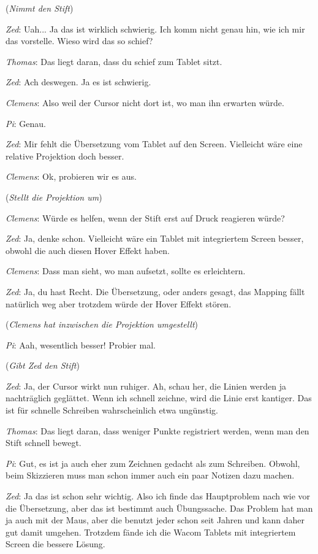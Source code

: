 \medskip (\emph{Nimmt den Stift})

\medskip \emph{Zed}: Uah... Ja das ist wirklich schwierig. Ich komm nicht genau hin, wie ich mir das vorstelle. Wieso wird das so schief?

\medskip \emph{Thomas}: Das liegt daran, dass du schief zum Tablet sitzt.

\medskip \emph{Zed}: Ach deswegen. Ja es ist schwierig.

\medskip \emph{Clemens}: Also weil der Cursor nicht dort ist, wo man ihn erwarten würde.

\medskip \emph{Pi}: Genau.

\medskip \emph{Zed}: Mir fehlt die Übersetzung vom Tablet auf den Screen. Vielleicht wäre eine relative Projektion doch besser.

\medskip \emph{Clemens}: Ok, probieren wir es aus.

\medskip (\emph{Stellt die Projektion um})

\medskip \emph{Clemens}: Würde es helfen, wenn der Stift erst auf Druck reagieren würde?

\medskip \emph{Zed}: Ja, denke schon. Vielleicht wäre ein Tablet mit integriertem Screen besser, obwohl die auch diesen Hover Effekt haben.

\medskip \emph{Clemens}: Dass man sieht, wo man aufsetzt, sollte es erleichtern.

\medskip \emph{Zed}: Ja, du hast Recht. Die Übersetzung, oder anders gesagt, das Mapping fällt natürlich weg aber trotzdem würde der Hover Effekt stören.

\medskip (\emph{Clemens hat inzwischen die Projektion umgestellt})

\medskip \emph{Pi}: Aah, wesentlich besser! Probier mal.

\medskip (\emph{Gibt Zed den Stift})

\medskip \emph{Zed}: Ja, der Cursor wirkt nun ruhiger. Ah, schau her, die Linien werden ja nachträglich geglättet. Wenn ich schnell zeichne, wird die Linie erst kantiger. Das ist für schnelle Schreiben wahrscheinlich etwa ungünstig.

\medskip \emph{Thomas}: Das liegt daran, dass weniger Punkte registriert werden, wenn man den Stift schnell bewegt.

\medskip \emph{Pi}: Gut, es ist ja auch eher zum Zeichnen gedacht als zum Schreiben. Obwohl, beim Skizzieren muss man schon immer auch ein paar Notizen dazu machen.

\medskip \emph{Zed}: Ja das ist schon sehr wichtig. Also ich finde das Hauptproblem nach wie vor die Übersetzung, aber das ist bestimmt auch Übungssache. Das Problem hat man ja auch mit der Maus, aber die benutzt jeder schon seit Jahren und kann daher gut damit umgehen. Trotzdem fände ich die Wacom Tablets mit integriertem Screen die bessere Lösung. 

